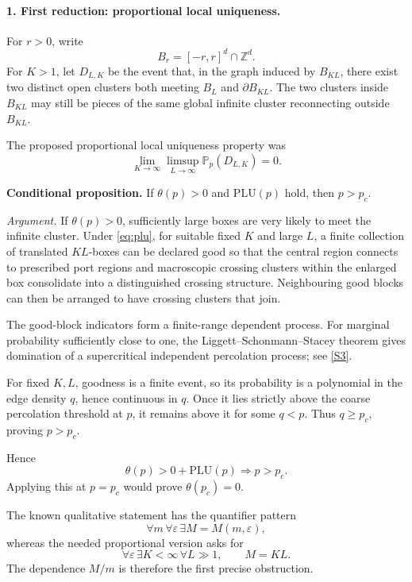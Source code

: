 \documentclass[11pt]{article}
\begin{document}
\paragraph{1. First reduction: proportional local uniqueness.}
For \(r>0\), write
\[
B_r=[-r,r]^d\cap\mathbb Z^d.
\]
For \(K>1\), let \(D_{L,K}\) be the event that, in the graph induced by \(B_{KL}\), there exist two distinct open clusters both meeting \(B_L\) and \(\partial B_{KL}\). The two clusters inside \(B_{KL}\) may still be pieces of the same global infinite cluster reconnecting outside \(B_{KL}\).

The proposed proportional local uniqueness property was
\[
\tag{PLU}\label{eq:plu}
\lim_{K\to\infty}\limsup_{L\to\infty}\mathbb P_p(D_{L,K})=0.
\]

\textbf{Conditional proposition.}
If \(\theta(p)>0\) and \(\mathrm{PLU}(p)\) hold, then \(p>p_c\).

\emph{Argument.}
If \(\theta(p)>0\), sufficiently large boxes are very likely to meet the infinite cluster. Under \eqref{eq:plu}, for suitable fixed \(K\) and large \(L\), a finite collection of translated \(KL\)-boxes can be declared good so that the central region connects to prescribed port regions and macroscopic crossing clusters within the enlarged box consolidate into a distinguished crossing structure. Neighbouring good blocks can then be arranged to have crossing clusters that join.

The good-block indicators form a finite-range dependent process. For marginal probability sufficiently close to one, the Liggett--Schonmann--Stacey theorem gives domination of a supercritical independent percolation process; see \href{https://projecteuclid.org/journals/annals-of-probability/volume-25/issue-1/Domination-by-product-measures/10.1214/aop/1024404279.pdf}{[S3]}.

For fixed \(K,L\), goodness is a finite event, so its probability is a polynomial in the edge density \(q\), hence continuous in \(q\). Once it lies strictly above the coarse percolation threshold at \(p\), it remains above it for some \(q<p\). Thus \(q\ge p_c\), proving \(p>p_c\).

Hence
\[
\boxed{\theta(p)>0+\mathrm{PLU}(p)\Longrightarrow p>p_c.}
\]
Applying this at \(p=p_c\) would prove \(\theta(p_c)=0\).

The known qualitative statement has the quantifier pattern
\[
\forall m\,\forall\varepsilon\,\exists M=M(m,\varepsilon),
\]
whereas the needed proportional version asks for
\[
\forall\varepsilon\,\exists K<\infty\,\forall L\gg1,\qquad M=KL.
\]
The dependence \(M/m\) is therefore the first precise obstruction.
\end{document}
